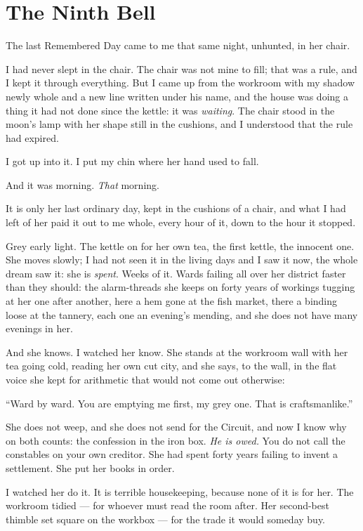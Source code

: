 \chapter{The Ninth Bell}

The last Remembered Day came to me that same night, unhunted, in her chair.

I had never slept in the chair. The chair was not mine to fill; that was a rule, and I kept it through everything. But I came up from the workroom with my shadow newly whole and a new line written under his name, and the house was doing a thing it had not done since the kettle: it was \emph{waiting}. The chair stood in the moon's lamp with her shape still in the cushions, and I understood that the rule had expired.

I got up into it. I put my chin where her hand used to fall.

And it was morning. \emph{That} morning.

It is only her last ordinary day, kept in the cushions of a chair, and what I had left of her paid it out to me whole, every hour of it, down to the hour it stopped.

Grey early light. The kettle on for her own tea, the first kettle, the innocent one. She moves slowly; I had not seen it in the living days and I saw it now, the whole dream saw it: she is \emph{spent}. Weeks of it. Wards failing all over her district faster than they should: the alarm-threads she keeps on forty years of workings tugging at her one after another, here a hem gone at the fish market, there a binding loose at the tannery, each one an evening's mending, and she does not have many evenings in her.

And she knows. I watched her know. She stands at the workroom wall with her tea going cold, reading her own cut city, and she says, to the wall, in the flat voice she kept for arithmetic that would not come out otherwise:

``Ward by ward. You are emptying me first, my grey one. That is craftsmanlike.''

She does not weep, and she does not send for the Circuit, and now I know why on both counts: the confession in the iron box. \emph{He is owed.} You do not call the constables on your own creditor. She had spent forty years failing to invent a settlement. She put her books in order.

I watched her do it. It is terrible housekeeping, because none of it is for her. The workroom tidied --- for whoever must read the room after. Her second-best thimble set square on the workbox --- for the trade it would someday buy.

